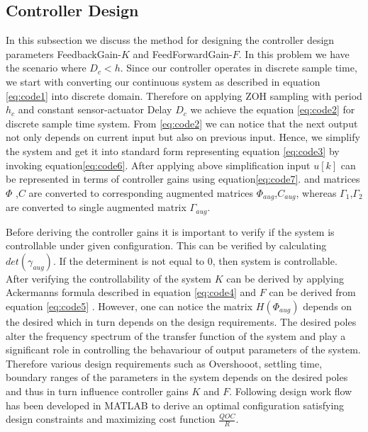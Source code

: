 \subsection{Controller Design}
In this subsection we discuss the method for designing the controller design parameters FeedbackGain-$K$ and FeedForwardGain-$F$. In this problem we have the scenario where $D_c<h$. Since our controller operates in discrete sample time, we start with converting our continuous system as described in equation \ref{eq:code1} into discrete domain. Therefore on applying ZOH sampling with period $h_c$ and constant sensor-actuator Delay $D_c$ we achieve the equation \ref{eq:code2} for discrete sample time system. From \ref{eq:code2} we can notice that the next output not only depends on current input but also on previous input. Hence, we simplify the system and get it into standard form representing equation \ref{eq:code3} by invoking equation\ref{eq:code6}. After applying above simplification input $u[k]$ can be represented in terms of controller gains using equation\ref{eq:code7}. 
and matrices $\Phi$ ,$C$ are converted to corresponding augmented matrices $\Phi_{aug}$,$C_{aug}$, whereas $\Gamma_1$,$\Gamma_2$ are converted to single augmented matrix $\Gamma_{aug}$.

  Before deriving the controller gains it is important to verify if the system is controllable under given configuration. This can be verified by calculating $det(\gamma_{aug})$. If the determinent is not equal to 0, then system is controllable. After verifying the controllability of the system $K$ can be derived by applying Ackermanns formula described in equation \ref{eq:code4} and $F$ can be derived from equation \ref{eq:code5} . However, one can notice the matrix $H(\Phi_{aug})$ depends on the desired which in turn depends on the design requirements. The desired poles alter the frequency spectrum of the transfer function of the system and play a significant role in controlling the behavariour of output parameters of the system. Therefore various design requirements such as Overshooot, settling time, boundary ranges of the parameters in the system depends on the desired poles and thus in turn influence controller gains $K$ and $F$. Following design work flow has been developed in MATLAB to derive an optimal configuration satisfying design constraints and maximizing cost function $\frac{QOC}{R}$.